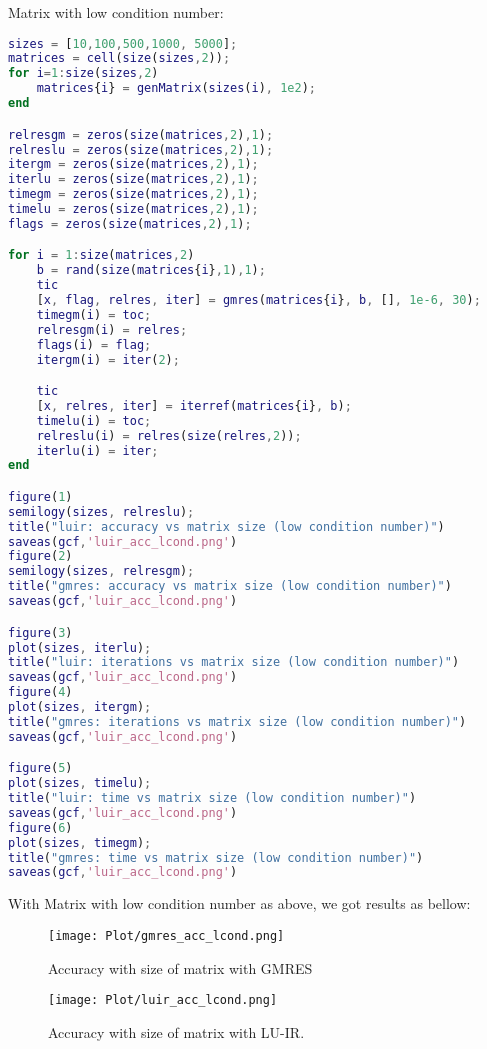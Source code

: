 Matrix with low condition number:
\begin{lstlisting}[language=matlab,caption=Matrix with low conditional number]
    sizes = [10,100,500,1000, 5000];
matrices = cell(size(sizes,2));
for i=1:size(sizes,2)
    matrices{i} = genMatrix(sizes(i), 1e2);
end

relresgm = zeros(size(matrices,2),1);
relreslu = zeros(size(matrices,2),1);
itergm = zeros(size(matrices,2),1);
iterlu = zeros(size(matrices,2),1);
timegm = zeros(size(matrices,2),1);
timelu = zeros(size(matrices,2),1);
flags = zeros(size(matrices,2),1);

for i = 1:size(matrices,2)
    b = rand(size(matrices{i},1),1);
    tic
    [x, flag, relres, iter] = gmres(matrices{i}, b, [], 1e-6, 30);
    timegm(i) = toc;
    relresgm(i) = relres;
    flags(i) = flag;
    itergm(i) = iter(2);

    tic
    [x, relres, iter] = iterref(matrices{i}, b);
    timelu(i) = toc;
    relreslu(i) = relres(size(relres,2));
    iterlu(i) = iter;
end

figure(1)
semilogy(sizes, relreslu);
title("luir: accuracy vs matrix size (low condition number)")
saveas(gcf,'luir_acc_lcond.png')
figure(2)
semilogy(sizes, relresgm);
title("gmres: accuracy vs matrix size (low condition number)")
saveas(gcf,'luir_acc_lcond.png')

figure(3)
plot(sizes, iterlu);
title("luir: iterations vs matrix size (low condition number)")
saveas(gcf,'luir_acc_lcond.png')
figure(4)
plot(sizes, itergm);
title("gmres: iterations vs matrix size (low condition number)")
saveas(gcf,'luir_acc_lcond.png')

figure(5)
plot(sizes, timelu);
title("luir: time vs matrix size (low condition number)")
saveas(gcf,'luir_acc_lcond.png')
figure(6)
plot(sizes, timegm);
title("gmres: time vs matrix size (low condition number)")
saveas(gcf,'luir_acc_lcond.png')

\end{lstlisting}
With Matrix with low condition number as above, we got results as bellow:
\begin{figure}[ht]
     \begin{minipage}[b]{0.5\linewidth}
        \centering
   \texttt{[image: Plot/gmres\_acc\_lcond.png]}
        \caption{Accuracy with size of matrix with GMRES}
        \label{fig:image19}
    \end{minipage}
    \hspace{0.5cm} 
    \begin{minipage}[b]{0.5\linewidth}
        \centering
        \texttt{[image: Plot/luir\_acc\_lcond.png]}
        \caption{Accuracy with size of matrix with LU-IR.}
        \label{fig:image20}
    \end{minipage}
\end{figure}

